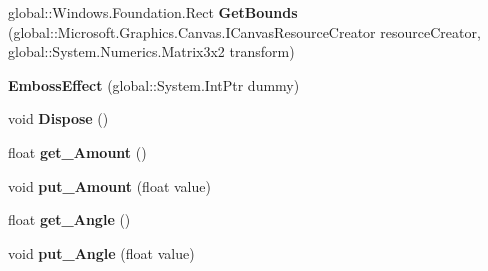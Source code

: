 \begin{DoxyCompactItemize}
\mbox{\label{class_microsoft_1_1_graphics_1_1_canvas_1_1_effects_1_1_emboss_effect_a332e3f4203f0f5fc176b241c611be3b3}} 
global\+::\+Windows.\+Foundation.\+Rect {\bfseries Get\+Bounds} (global\+::\+Microsoft.\+Graphics.\+Canvas.\+I\+Canvas\+Resource\+Creator resource\+Creator, global\+::\+System.\+Numerics.\+Matrix3x2 transform)
\item 
\mbox{\label{class_microsoft_1_1_graphics_1_1_canvas_1_1_effects_1_1_emboss_effect_a2d3861da33bd9475d1e949275788def0}} 
{\bfseries Emboss\+Effect} (global\+::\+System.\+Int\+Ptr dummy)
\item 
\mbox{\label{class_microsoft_1_1_graphics_1_1_canvas_1_1_effects_1_1_emboss_effect_aa39c97e030897236bc8071c5e9c5de62}} 
void {\bfseries Dispose} ()
\item 
\mbox{\label{class_microsoft_1_1_graphics_1_1_canvas_1_1_effects_1_1_emboss_effect_ad824b28bb284838b16307bbffbeb0668}} 
float {\bfseries get\+\_\+\+Amount} ()
\item 
\mbox{\label{class_microsoft_1_1_graphics_1_1_canvas_1_1_effects_1_1_emboss_effect_a49add22dd56a5fa85ae8c613d6b7561c}} 
void {\bfseries put\+\_\+\+Amount} (float value)
\item 
\mbox{\label{class_microsoft_1_1_graphics_1_1_canvas_1_1_effects_1_1_emboss_effect_a26a7de6dacb9be149789779457828ed3}} 
float {\bfseries get\+\_\+\+Angle} ()
\item 
\mbox{\label{class_microsoft_1_1_graphics_1_1_canvas_1_1_effects_1_1_emboss_effect_ad7260653a41639ec65d5c966c05ba7a2}} 
void {\bfseries put\+\_\+\+Angle} (float value)
\item 
\mbox{\label{class_microsoft_1_1_graphics_1_1_canvas_1_1_effects_1_1_emboss_effect_a36340e7d6e5ac47dd89f4f7d37c07345}} 

\end{DoxyCompactItemize}
